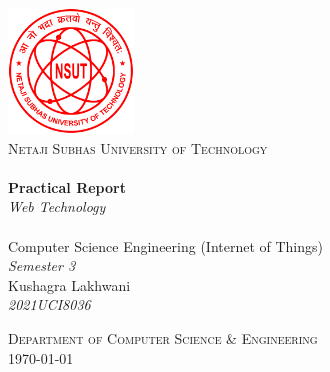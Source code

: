 \begin{titlepage}
    \begin{center}


        \includegraphics[width=0.25\textwidth]{res/NSUT.png}~\\[0.5cm]
        \textsc{\Large Netaji Subhas University of Technology}\\[2cm]


        \HRule \\[0.4cm]
        {
        \LARGE
        \textbf{Practical Report}\\[0.4cm]
        \emph{Web Technology}\\[0.4cm]
        }
        \HRule \\[1.5cm]


        {
        \large
        Computer Science Engineering (Internet of Things)\\[0.1cm]
        \textit{Semester 3} \\[2.7cm]
        Kushagra Lakhwani \\[0.1cm]
        \textit{2021UCI8036}\\[0.1cm]
        }

        \vfill

        \textsc{\large Department of Computer Science \& Engineering}\\[0.4cm]



        {\large \today}

    \end{center}
\end{titlepage}

